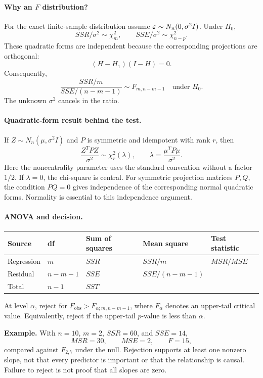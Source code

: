 \documentclass[11pt]{article}
\begin{document}
\paragraph{Why an $F$ distribution?}
For the exact finite-sample distribution assume $\boldsymbol\varepsilon\sim N_n(0,\sigma^2I)$. Under $H_0$,
\[
SSR/\sigma^2\sim\chi_m^2,\qquad SSE/\sigma^2\sim\chi_{n-p}^2.
\]
These quadratic forms are independent because the corresponding projections are orthogonal:
\[
(H-H_1)(I-H)=0.
\]
Consequently,
\[
\boxed{\frac{SSR/m}{SSE/(n-m-1)}\sim F_{m,n-m-1}\quad\text{under }H_0.}
\]
The unknown $\sigma^2$ cancels in the ratio.

\paragraph{Quadratic-form result behind the test.}
If $Z\sim N_n(\mu,\sigma^2I)$ and $P$ is symmetric and idempotent with rank $r$, then
\[
\frac{Z^TPZ}{\sigma^2}\sim\chi_r^2(\lambda),\qquad
\lambda=\frac{\mu^TP\mu}{\sigma^2}.
\]
Here the noncentrality parameter uses the standard convention without a factor $1/2$. If $\lambda=0$, the chi-square is central. For symmetric projection matrices $P,Q$, the condition $PQ=0$ gives independence of the corresponding normal quadratic forms. Normality is essential to this independence argument.

\paragraph{ANOVA and decision.}
\begin{center}
\begin{tabular}{lllll}\toprule
Source&df&Sum of squares&Mean square&Test statistic\\\midrule
Regression&$m$&$SSR$&$SSR/m$&$MSR/MSE$\\
Residual&$n-m-1$&$SSE$&$SSE/(n-m-1)$&\\
Total&$n-1$&$SST$&&\\\bottomrule
\end{tabular}
\end{center}
At level $\alpha$, reject for $F_{\mathrm{obs}}>F_{\alpha;m,n-m-1}$, where $F_\alpha$ denotes an upper-tail critical value. Equivalently, reject if the upper-tail $p$-value is less than $\alpha$.

\textbf{Example.} With $n=10$, $m=2$, $SSR=60$, and $SSE=14$,
\[
MSR=30,\qquad MSE=2,\qquad F=15,
\]
compared against $F_{2,7}$ under the null. Rejection supports at least one nonzero slope, not that every predictor is important or that the relationship is causal. Failure to reject is not proof that all slopes are zero.
\end{document}
